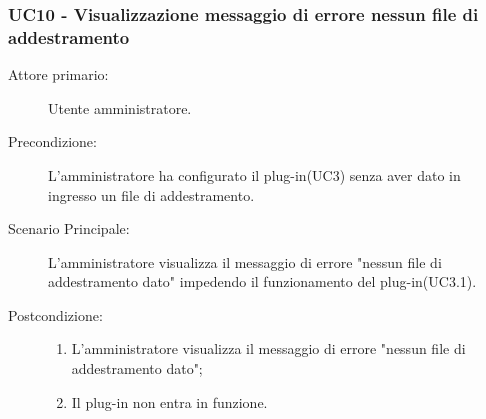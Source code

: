 \subsubsection{UC10 - Visualizzazione messaggio di errore nessun file di addestramento}
\label{sssec:uc10}
\begin{description}
	\item[Attore primario:] Utente amministratore.
	\item[Precondizione:] L'amministratore ha configurato il plug-in(UC3) senza aver dato in ingresso un file di addestramento.
	\item[Scenario Principale:] L'amministratore visualizza il messaggio di errore "nessun file di addestramento dato" impedendo il funzionamento del plug-in(UC3.1).
	\item[Postcondizione:]
	\begin{enumerate}
		\item L'amministratore visualizza il messaggio di errore "nessun file di addestramento dato";
		\item Il plug-in non entra in funzione.
	\end{enumerate}
\end{description}
